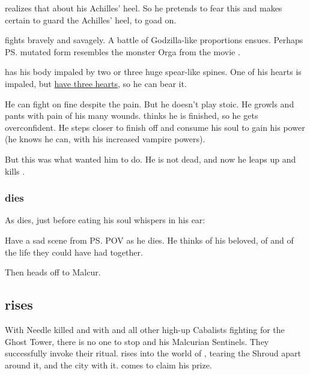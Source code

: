 \begin{garbage}
\Ishnaruchaefir{} realizes that \Teshrial{}  about his Achilles' heel. 
So he pretends to fear this and makes certain to guard the Achilles' heel, to goad \Teshrial{} on. 

\Teshrial{} fights bravely and savagely. 
A battle of Godzilla-like proportions ensues. 
Perhaps \ps{\Teshrial} mutated form resembles the monster Orga from the movie \cite{Movie:Godzilla2000}. 

\Ishnaruchaefir{} has his body impaled by two or three huge spear-like spines. 
One of his hearts is impaled, but \hyperref[Dragons have three hearts]{\dragons{} have three hearts}, so he can bear it. 

He can fight on fine despite the pain. 
But he doesn't play stoic. 
He growls and pants with pain of his many wounds. 
\Teshrial{} thinks he is finished, so he gets overconfident. 
He steps closer to finish off \Ishnaruchaefir{} and consume his soul to gain his power (he knows he can, with his increased vampire powers). 


But this was what \Ishnaruchaefir{} wanted him to do. 
He is not dead, and now he leaps up and kills \Teshrial. 





\subsubsection{\Teshrial{} dies}
As \Teshrial{} dies, just before eating his soul \Ishnaruchaefir{} whispers in his ear: 

Have a sad scene from \ps{\Teshrial} POV as he dies. 
He thinks of his beloved, of  and of the life they could have had together. 

Then \Ishnaruchaefir{} heads off to Malcur.









\subsection{\Nithdornazsh{} rises}
With Needle killed and with \Achsah{} and all other high-up Cabalists fighting for the Ghost Tower, there is no one to stop \Psyrex{} and his Malcurian Sentinels.
They successfully invoke their ritual. \Nithdornazsh{} rises into the world of \Miith{}, tearing the Shroud apart around it, and the city with it. \Secherdamon{} comes to claim his prize. 


\end{garbage}
